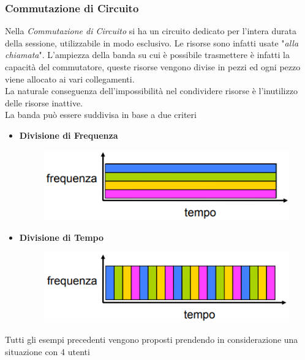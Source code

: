 \documentclass{article}
\begin{document}
            \subsubsection{Commutazione di Circuito}
                Nella \textit{Commutazione di Circuito} si ha un circuito dedicato per l'intera durata della sessione, utilizzabile in modo esclusivo. Le risorse sono infatti usate "\textit{alla chiamata}". L'ampiezza della banda su cui è possibile trasmettere è infatti la capacità del commutatore, queste risorse vengono divise in pezzi ed ogni pezzo viene allocato ai vari collegamenti.\\ 
                La naturale conseguenza dell'impossibilità nel condividere risorse è l'inutilizzo delle risorse inattive.\\
                La banda può essere suddivisa in base a due criteri
                \begin{itemize}
                    \item \textbf{Divisione di Frequenza}
                          \begin{figure}[H]
                              \centering
                              \includegraphics[width=\textwidth]{pic/fdm.png}
                              \label{Divisione di Frequenza}
                          \end{figure}
                    \item \textbf{Divisione di Tempo}
                          \begin{figure}[H]
                              \centering
                              \includegraphics[width=\textwidth]{pic/tdm.png}
                              \label{Divisione di Tempo}
                          \end{figure}
                \end{itemize}
                Tutti gli esempi precedenti vengono proposti prendendo in considerazione una situazione con 4 utenti 
\end{document}
